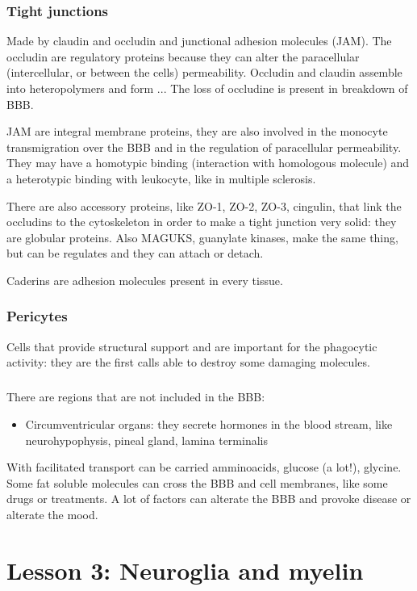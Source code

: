 \documentclass[a4paper, 12pt]{book}
\begin{document}
\subsection{Tight junctions}
Made by claudin and occludin and junctional adhesion molecules (JAM). The occludin are regulatory proteins because they can alter the paracellular (intercellular, or between the cells) permeability. Occludin and claudin assemble into heteropolymers and form ... The loss of occludine is present in breakdown of BBB.

JAM are integral membrane proteins, they are also involved in the monocyte transmigration over the BBB and in the regulation of paracellular permeability. They may have a homotypic binding (interaction with homologous molecule) and a heterotypic binding with leukocyte, like in multiple sclerosis. 

There are also accessory proteins, like ZO-1, ZO-2, ZO-3, cingulin, that link the occludins  to the cytoskeleton in order to make a tight junction very solid: they are globular proteins. Also MAGUKS, guanylate kinases, make the same thing, but can be regulates and they can attach or detach.

Caderins are adhesion molecules present in every tissue.

\subsection{Pericytes}
Cells that provide structural support and are important for the phagocytic activity: they are the first calls able to destroy some damaging molecules.

\paragraph{}

There are regions that are not included in the BBB:
\begin{itemize}
\item{Circumventricular organs: they secrete hormones in the blood stream, like neurohypophysis, pineal gland, lamina terminalis}
\end{itemize}

With facilitated transport can be carried amminoacids, glucose (a lot!), glycine.  
Some fat soluble molecules can cross the BBB and cell membranes, like some drugs or treatments.
A lot of factors can alterate the BBB and provoke disease or alterate the mood.

\chapter{Lesson 3: Neuroglia and myelin}
\end{document}
